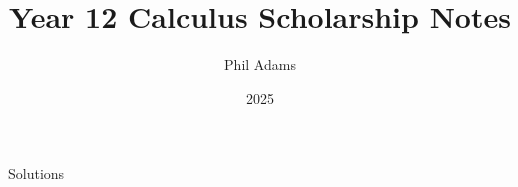 \documentclass[12pt, letterpaper]{article}
\title{Year 12 Calculus Scholarship Notes}
\author{Phil Adams}
\date{2025}
\begin{document}
\maketitle

\pagebreak

\tableofcontents
\setlength{\parskip}{10pt}
\pagebreak

\pagebreak

\pagebreak

\pagebreak

\pagebreak

\pagebreak

\pagebreak

\pagebreak

\pagebreak

\pagebreak

\pagebreak

\pagebreak

\pagebreak

\pagebreak



\pagebreak
{}
\begin{center}
    \huge
    Solutions
    \normalsize
\end{center}
\restoregeometry

\pagebreak

\pagebreak

\pagebreak

\pagebreak

\pagebreak

\pagebreak

\pagebreak

\pagebreak

\pagebreak

\pagebreak

\pagebreak

\pagebreak

\pagebreak

\end{document}
